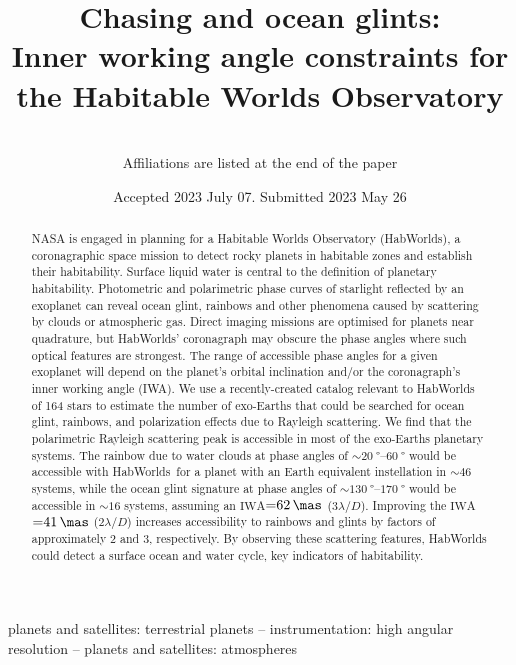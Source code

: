 \documentclass[usenatbib]{mnras}
\title{Chasing \rainbows and ocean glints:\\ Inner working angle constraints for the Habitable Worlds Observatory}
\author[Sophia R. Vaughan et al.]{%
    
    \newauthor 
    \\%
    Affiliations are listed at the end of the paper
}
\date{Accepted 2023 July 07. Submitted 2023 May 26}
\newcommand{\IWA}{\ensuremath{\mathrm{IWA}}\xspace}
\newcommand{\HWO}{HabWorlds\xspace}
\begin{document}
 

\maketitle

\begin{abstract}
NASA is engaged in planning for a Habitable Worlds Observatory (\HWO), a coronagraphic space mission to detect rocky planets in habitable zones and establish their habitability. 
%
Surface liquid water is central to the definition of planetary habitability.
%
Photometric and polarimetric phase curves of starlight reflected by an exoplanet can reveal ocean glint, rainbows and other phenomena caused by scattering by clouds or atmospheric gas.
%
Direct imaging missions are optimised for planets near quadrature, but \HWO' coronagraph may obscure the phase angles where such optical features are strongest. 
%
The range of accessible phase angles for a given exoplanet will depend on the planet's orbital inclination and/or the coronagraph's inner working angle (IWA). 
%
We use a recently-created catalog relevant to HabWorlds of 164 stars to estimate the number of exo-Earths that could be searched for ocean glint, rainbows, and polarization effects due to Rayleigh scattering. 
%
We find that the polarimetric Rayleigh scattering peak is accessible in most of the exo-Earths planetary systems.
%
The rainbow due to water clouds at phase angles of ${\sim}\qtyrange{20}{60}{\degree}$ would be accessible with \HWO\ for a planet with an Earth equivalent instellation in ${\sim}\num{46}$ systems, while the ocean glint signature at phase angles of ${\sim}\qtyrange{130}{170}{\degree}$ would be accessible in ${\sim}\num{16}$ systems, assuming an \IWA${=}\qty{62}{\mas}$ ($3\lambda/D$).
%
Improving the \IWA${=}\qty{41}{\mas}$ ($2\lambda/D$) increases accessibility to rainbows and glints by factors of approximately 2 and 3, respectively.
%
By observing these scattering features, \HWO could detect a surface ocean and water cycle, key indicators of habitability.
\end{abstract}

\begin{keywords}
    planets and satellites: terrestrial planets -- 
    instrumentation: high angular resolution -- 
    planets and satellites: atmospheres
\end{keywords}

\end{document}
